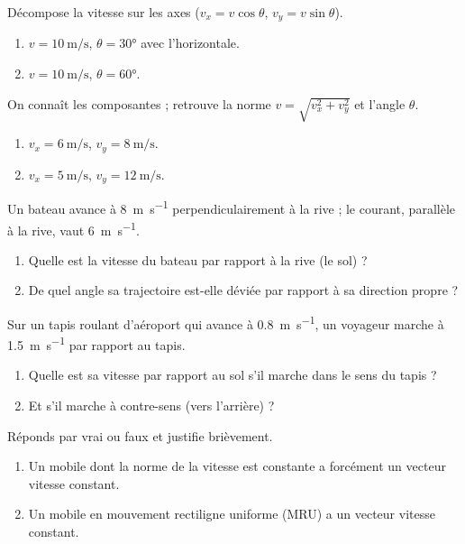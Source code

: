 \documentclass[11pt,a4paper]{article}
\begin{document}

\begin{exo}
Décompose la vitesse sur les axes ($v_x=v\cos\theta$, $v_y=v\sin\theta$).
\begin{enumerate}[label=\alph*)]
  \item $v=\qty{10}{\metre\per\second}$, $\theta=\ang{30}$ avec l'horizontale.
  \item $v=\qty{10}{\metre\per\second}$, $\theta=\ang{60}$.
\end{enumerate}
\end{exo}

\begin{exo}
On connaît les composantes ; retrouve la norme $v=\sqrt{v_x^2+v_y^2}$ et l'angle $\theta$.
\begin{enumerate}[label=\alph*)]
  \item $v_x=\qty{6}{\metre\per\second}$, $v_y=\qty{8}{\metre\per\second}$.
  \item $v_x=\qty{5}{\metre\per\second}$, $v_y=\qty{12}{\metre\per\second}$.
\end{enumerate}
\end{exo}

\begin{exo}
Un bateau avance à \qty{8}{\metre\per\second} perpendiculairement à la rive ; le courant, parallèle
à la rive, vaut \qty{6}{\metre\per\second}.
\begin{enumerate}[label=\alph*)]
  \item Quelle est la vitesse du bateau par rapport à la rive (le sol) ?
  \item De quel angle sa trajectoire est-elle déviée par rapport à sa direction propre ?
\end{enumerate}
\end{exo}

\begin{exo}
Sur un tapis roulant d'aéroport qui avance à \qty{0,8}{\metre\per\second}, un voyageur marche à
\qty{1,5}{\metre\per\second} par rapport au tapis.
\begin{enumerate}[label=\alph*)]
  \item Quelle est sa vitesse par rapport au sol s'il marche dans le sens du tapis ?
  \item Et s'il marche à contre-sens (vers l'arrière) ?
\end{enumerate}
\end{exo}

\begin{exo}
Réponds par vrai ou faux et justifie brièvement.
\begin{enumerate}[label=\alph*)]
  \item Un mobile dont la norme de la vitesse est constante a forcément un vecteur vitesse constant.
  \item Un mobile en mouvement rectiligne uniforme (MRU) a un vecteur vitesse constant.
\end{enumerate}
\end{exo}
\end{document}
